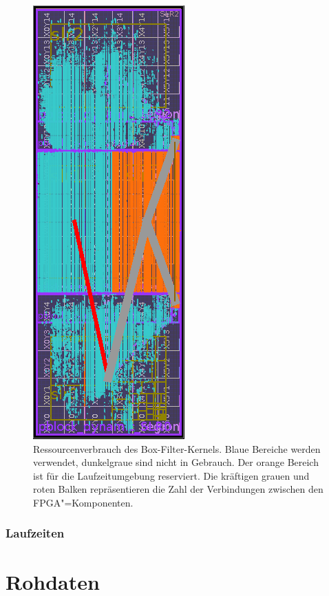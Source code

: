 \begin{figure}[htb]
    \centering
    \includegraphics{box_resources.png}
    \caption[Ressourcenverbrauch des Box-Filter-Kernels]{Ressourcenverbrauch des
             Box-Filter-Kernels. Blaue Bereiche werden verwendet, dunkelgraue
             sind nicht in Gebrauch. Der orange Bereich ist für die
             Laufzeitumgebung reserviert. Die kräftigen grauen und roten Balken
             repräsentieren die Zahl der Verbindungen zwischen den
             FPGA"=Komponenten.}
\end{figure}

\subsubsection{Laufzeiten}

\section{Rohdaten}

